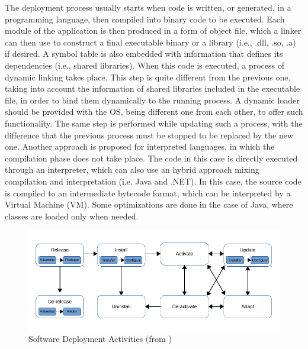 The deployment process usually starts when code is written, or generated, in a programming language, then compiled into binary code to be executed.
Each module of the application is then produced in a form of object file, which a linker can then use to construct a final executable binary or a library (i.e., .dll, .so, .a) if desired.
A symbol table is also embedded with information that defines its dependencies (i.e., shared libraries).
When this code is executed, a process of dynamic linking takes place.
This step is quite different from the previous one, taking into account the information of shared libraries included in the executable file, in order to bind them dynamically to the running process.
A dynamic loader should be provided with the OS, being different one from each other, to offer such functionality.
The same step is performed while updating such a process, with the difference that the previous process must be stopped to be replaced by the new one.
Another approach is proposed for interpreted languages, in which the compilation phase does not take place.
The code in this case is directly executed through an interpreter, which can also use an hybrid approach mixing compilation and interpretation (i.e. Java and .NET).
In this case, the source code is compiled to an intermediate bytecode format, which can be interpreted by a Virtual Machine (VM).
Some optimizations are done in the case of Java, where classes are loaded only when needed.

\begin{figure}[htb]
	\centering
	\includegraphics[width=1\columnwidth]{chapters/stateOfTheArt.images/DeploymentActivities.pdf}
	\caption{Software Deployment Activities (from \cite{gunalp2014continuous})}
	\label{fig:DeployActivities}
\end{figure}

